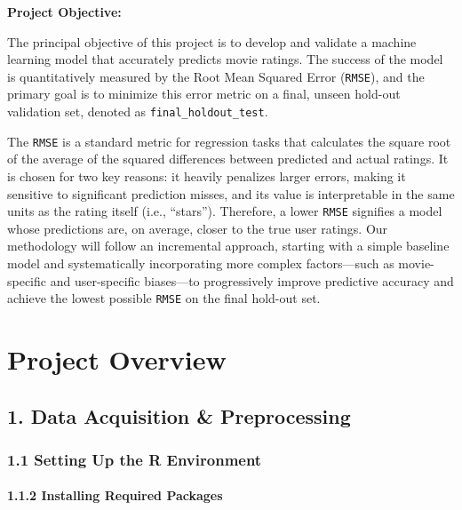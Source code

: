 \documentclass[
]{article}
\begin{document}
\textbf{Project Objective:}

The principal objective of this project is to develop and validate a
machine learning model that accurately predicts movie ratings. The
success of the model is quantitatively measured by the Root Mean Squared
Error (\texttt{RMSE}), and the primary goal is to minimize this error
metric on a final, unseen hold-out validation set, denoted as
\texttt{final\_holdout\_test}.

The \texttt{RMSE} is a standard metric for regression tasks that
calculates the square root of the average of the squared differences
between predicted and actual ratings. It is chosen for two key reasons:
it heavily penalizes larger errors, making it sensitive to significant
prediction misses, and its value is interpretable in the same units as
the rating itself (i.e., ``stars''). Therefore, a lower \texttt{RMSE}
signifies a model whose predictions are, on average, closer to the true
user ratings. Our methodology will follow an incremental approach,
starting with a simple baseline model and systematically incorporating
more complex factors---such as movie-specific and user-specific
biases---to progressively improve predictive accuracy and achieve the
lowest possible \texttt{RMSE} on the final hold-out set.

\newpage

\section{Project Overview}\label{project-overview}

\subsection{1. Data Acquisition \&
Preprocessing}\label{data-acquisition-preprocessing}

\subsubsection{1.1 Setting Up the R
Environment}\label{setting-up-the-r-environment}

\paragraph{1.1.2 Installing Required
Packages}\label{installing-required-packages}
\end{document}
